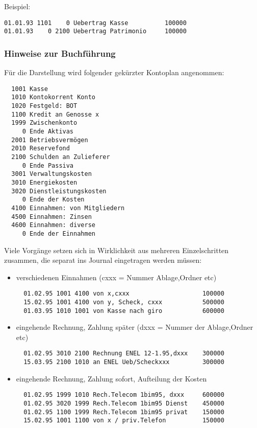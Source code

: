 \documentclass[12pt]{report}
\begin{document}
\begin{appendix}
Beispiel:

\begin{verbatim}
01.01.93 1101    0 Uebertrag Kasse          100000
01.01.93    0 2100 Uebertrag Patrimonio     100000
\end{verbatim}

\subsubsection{Hinweise zur Buchführung}

Für die Darstellung wird folgender gekürzter Kontoplan angenommen:
\begin{verbatim}
  1001 Kasse
  1010 Kontokorrent Konto
  1020 Festgeld: BOT
  1100 Kredit an Genosse x
  1999 Zwischenkonto
     0 Ende Aktivas
  2001 Betriebsvermögen
  2010 Reservefond
  2100 Schulden an Zulieferer
     0 Ende Passiva
  3001 Verwaltungskosten
  3010 Energiekosten
  3020 Dienstleistungskosten
     0 Ende der Kosten
  4100 Einnahmen: von Mitgliedern
  4500 Einnahmen: Zinsen
  4600 Einnahmen: diverse
     0 Ende der Einnahmen
\end{verbatim}

Viele Vorgänge setzen sich in Wirklichkeit aus mehreren Einzelschritten
zusammen, die separat ins Journal eingetragen werden müssen:

\begin{itemize}

\item verschiedenen Einnahmen (cxxx = Nummer Ablage,Ordner etc)
  \begin{verbatim}
  01.02.95 1001 4100 von x,cxxx                    100000
  15.02.95 1001 4100 von y, Scheck, cxxx           500000
  01.03.95 1010 1001 von Kasse nach giro           600000
  \end{verbatim}

\item eingehende Rechnung, Zahlung später (dxxx = Nummer der Ablage,Ordner etc)
  \begin{verbatim}
  01.02.95 3010 2100 Rechnung ENEL 12-1.95,dxxx    300000
  15.03.95 2100 1010 an ENEL Ueb/Scheckxxx         300000
  \end{verbatim}

\item eingehende Rechnung, Zahlung sofort, Aufteilung der Kosten
  \begin{verbatim}
  01.02.95 1999 1010 Rech.Telecom 1bim95, dxxx     600000
  01.02.95 3020 1999 Rech.Telecom 1bim95 Dienst    450000
  01.02.95 1100 1999 Rech.Telecom 1bim95 privat    150000
  15.02.95 1001 1100 von x / priv.Telefon          150000
  \end{verbatim}


\end{itemize}
\end{appendix}
\end{document}
